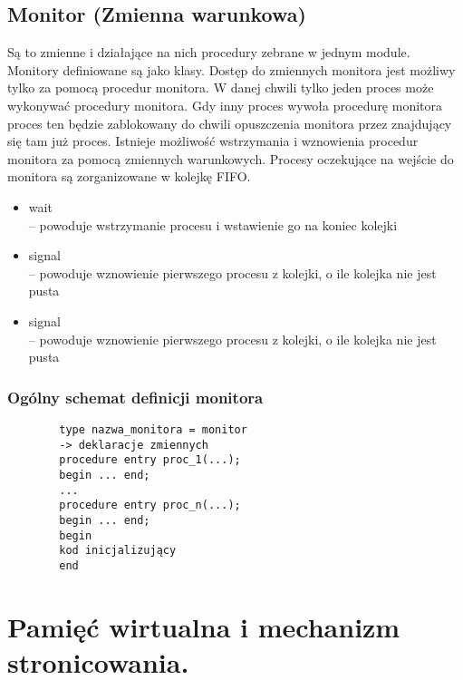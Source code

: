 \documentclass[main.tex]{subfiles}
\begin{document}
    \subsection{Monitor (Zmienna warunkowa)}
    Są to zmienne i działające na nich procedury zebrane w jednym module. Monitory definiowane są jako klasy. Dostęp do zmiennych monitora jest możliwy tylko za pomocą procedur monitora. W danej chwili tylko jeden proces może wykonywać procedury monitora. Gdy inny proces wywoła procedurę monitora proces ten będzie zablokowany do chwili opuszczenia monitora przez znajdujący się tam już proces. Istnieje możliwość wstrzymania i wznowienia procedur monitora za pomocą zmiennych warunkowych. Procesy oczekujące na wejście do monitora są zorganizowane w kolejkę FIFO.

    \begin{itemize}
        \item wait\\ – powoduje wstrzymanie procesu i wstawienie go na koniec kolejki
        \item signal\\ – powoduje wznowienie pierwszego procesu z kolejki, o ile kolejka nie jest pusta
        \item signal\\ – powoduje wznowienie pierwszego procesu z kolejki, o ile kolejka nie jest pusta
    \end{itemize}

    \subsubsection{Ogólny schemat definicji monitora}


    \begin{verbatim}
        type nazwa_monitora = monitor
        -> deklaracje zmiennych
        procedure entry proc_1(...);
        begin ... end;
        ...
        procedure entry proc_n(...);
        begin ... end;
        begin
        kod inicjalizujący
        end
    \end{verbatim}

    \newpage

    \section{Pamięć wirtualna i mechanizm stronicowania.}
\end{document}
